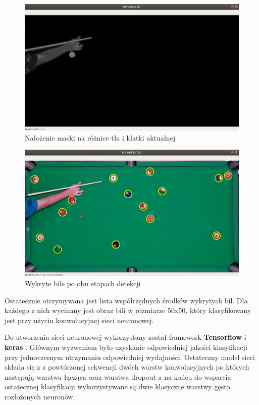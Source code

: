 \documentclass[12pt]{article}
\begin{document}
\begin{enumerate} [noitemsep]
    \begin{figure}[!ht]
        \centering
        \includegraphics[width=15cm]{./images/obrazki/bp/masked_hc.png}
        \caption{Nałożenie maski na różnice tła i klatki aktualnej}
        \label{masked_hc}
    \end{figure}

    \newpage

    \begin{figure}[!ht]
        \centering
        \includegraphics[width=15cm]{./images/obrazki/bp/bp_detected_2.png}
        \caption{Wykryte bile po obu etapach detekcji}
        \label{bp_detected2}
    \end{figure}

    Ostatecznie otrzymywana jest lista współrzędnych środków wykrytych bil. Dla każdego z nich wycinany jest obraz bili w rozmiarze 50x50, który klasyfikowany jest przy użyciu konwolucyjnej sieci neuronowej.
    
    \vspace{0.5cm}
    
    Do utworzenia sieci neuronowej wykorzystany został framework \textbf{Tensorflow} \cite{TensorFlow} i \textbf{keras} \cite{keras}. Głównym wyzwaniem było uzyskanie odpowiedniej jakości klasyfikacji przy jednoczesnym utrzymaniu odpowiedniej wydajności.
    Ostateczny model sieci składa się z z powtórzonej sekwencji dwóch warstw konwolucyjnych po których następują warstwa łącząca oraz warstwa dropout a na końcu do wsparcia ostatecznej klasyfikacji wykorzystywane są dwie klasyczne warstwy gęsto rozłożonych neuronów. 
    

\end{enumerate}
\end{document}
